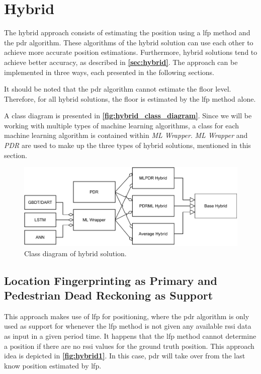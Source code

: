 \section{Hybrid} \label{sec:hybrid_theory}
The hybrid approach consists of estimating the position using a \gls{lfp} method and the \gls{pdr} algorithm. These algorithms of the hybrid solution can use each other to achieve more accurate position estimations. Furthermore, hybrid solutions tend to achieve better accuracy, as described in \textbf{\autoref{sec:hybrid}}. The approach can be implemented in three ways, each presented in the following sections.

It should be noted that the \gls{pdr} algorithm cannot estimate the floor level. Therefore, for all hybrid solutions, the floor is estimated by the \gls{lfp} method alone.

A class diagram is presented in \textbf{\autoref{fig:hybrid_class_diagram}}. Since we will be working with multiple types of machine learning algorithms, a class for each machine learning algorithm is contained within \textit{ML Wrapper}. \textit{ML Wrapper} and \textit{PDR} are used to make up the three types of hybrid solutions, mentioned in this section.

\begin{figure}[H]
    \centering
    \includegraphics[scale=1]{Images/Experiments/hybrid/HybridClassDiagram.pdf}
    \caption{Class diagram of hybrid solution.}
     \label{fig:hybrid_class_diagram}
\end{figure}

\subsection{Location Fingerprinting as Primary and Pedestrian Dead Reckoning as Support}
This approach makes use of \gls{lfp} for positioning, where the \gls{pdr} algorithm is only used as support for whenever the \gls{lfp} method is not given any available \gls{rssi} data as input in a given period time. 
It happens that the \gls{lfp} method cannot determine a position if there are no \gls{rssi} values for the ground truth position. This approach idea is depicted in \textbf{\autoref{fig:hybrid1}}. In this case, \gls{pdr} will take over from the last know position estimated by \gls{lfp}.

